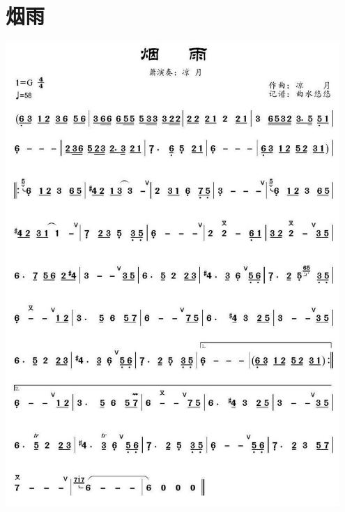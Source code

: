 \documentclass[cn,pad,twocol]{elegantbook}
\begin{document}
\section{烟雨}      \includegraphics[width=0.95\textwidth]{dongxiao/20200909-烟雨.jpg}
\end{document}
